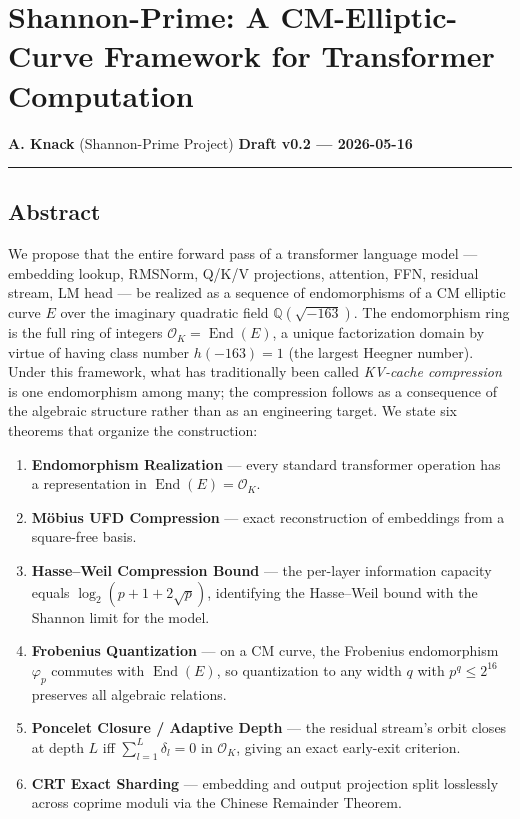 \documentclass[
  11pt,
]{article}
\author{}
\date{}
\providecommand{\tightlist}{%
  \setlength{\itemsep}{0pt}\setlength{\parskip}{0pt}}
\begin{document}
\hypertarget{shannon-prime-a-cm-elliptic-curve-framework-for-transformer-computation}{%
\section{Shannon-Prime: A CM-Elliptic-Curve Framework for Transformer
Computation}\label{shannon-prime-a-cm-elliptic-curve-framework-for-transformer-computation}}

\textbf{A. Knack} (Shannon-Prime Project) \textbf{Draft v0.2 ---
2026-05-16}

\begin{center}\rule{0.5\linewidth}{0.5pt}\end{center}

\hypertarget{abstract}{%
\subsection{Abstract}\label{abstract}}

We propose that the entire forward pass of a transformer language model
--- embedding lookup, RMSNorm, Q/K/V projections, attention, FFN,
residual stream, LM head --- be realized as a sequence of endomorphisms
of a CM elliptic curve \(E\) over the imaginary quadratic field
\(\mathbb{Q}(\sqrt{-163})\). The endomorphism ring is the full ring of
integers \(\mathcal{O}_K = \operatorname{End}(E)\), a unique
factorization domain by virtue of having class number \(h(-163) = 1\)
(the largest Heegner number). Under this framework, what has
traditionally been called \emph{KV-cache compression} is one
endomorphism among many; the compression follows as a consequence of the
algebraic structure rather than as an engineering target. We state six
theorems that organize the construction:

\begin{enumerate}
\def\labelenumi{\arabic{enumi}.}
\tightlist
\item
  \textbf{Endomorphism Realization} --- every standard transformer
  operation has a representation in
  \(\operatorname{End}(E) = \mathcal{O}_K\).
\item
  \textbf{Möbius UFD Compression} --- exact reconstruction of embeddings
  from a square-free basis.
\item
  \textbf{Hasse--Weil Compression Bound} --- the per-layer information
  capacity equals \(\log_2(p + 1 + 2\sqrt{p})\), identifying the
  Hasse--Weil bound with the Shannon limit for the model.
\item
  \textbf{Frobenius Quantization} --- on a CM curve, the Frobenius
  endomorphism \(\varphi_p\) commutes with \(\operatorname{End}(E)\), so
  quantization to any width \(q\) with \(p^q \leq 2^{16}\) preserves all
  algebraic relations.
\item
  \textbf{Poncelet Closure / Adaptive Depth} --- the residual stream's
  orbit closes at depth \(L\) iff \(\sum_{l=1}^L \delta_l = 0\) in
  \(\mathcal{O}_K\), giving an exact early-exit criterion.
\item
  \textbf{CRT Exact Sharding} --- embedding and output projection split
  losslessly across coprime moduli via the Chinese Remainder Theorem.
\end{enumerate}
\end{document}
